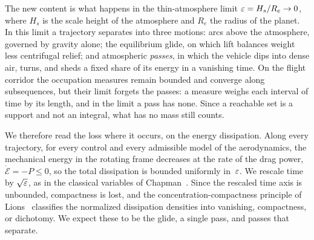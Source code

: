 \documentclass[english,10pt]{extarticle}
\begin{document}
The new content is what happens in the thin-atmosphere limit
$\varepsilon = H_s/R_e\to 0$, where $H_s$ is the scale height of the atmosphere
and $R_e$ the radius of the planet. In this limit a trajectory separates
into three motions: arcs above the atmosphere, governed by gravity alone;
the equilibrium glide, on which lift balances weight less centrifugal
relief; and atmospheric \emph{passes}, in which the vehicle dips into dense
air, turns, and sheds a fixed share of its energy in a vanishing time. On
the flight corridor the occupation measures remain bounded and converge
along subsequences, but their limit forgets the passes: a measure weighs
each interval of time
by its length, and in the limit a pass has none. Since a reachable set is a
support and not an integral, what has no mass still counts.

We therefore read the loss where it occurs, on the energy dissipation.
Along every trajectory, for every control and every admissible model of
the aerodynamics, the mechanical energy in the rotating frame decreases at
the rate of the drag power, $\dot{\mathcal{E}} = -P\le 0$, so the total
dissipation is bounded uniformly in~$\varepsilon$. We rescale time by
$\sqrt{\varepsilon}$, as in the classical variables of
Chapman~\cite{chapman1959approximate}. Since the rescaled time axis is
unbounded, compactness is lost, and the concentration-compactness principle
of Lions~\cite{lions1984concentration1} classifies the normalized
dissipation densities into vanishing, compactness, or dichotomy. We expect
these to be the glide, a single pass, and passes that separate.
\end{document}
